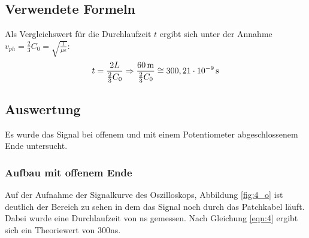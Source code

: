 \documentclass[12pt,a4paper]{article}
\begin{document}
\subsection{Verwendete Formeln}
Als Vergleichswert für die Durchlaufzeit $t$ ergibt sich unter der Annahme $v_{ph} = \frac{2}{3}C_0 = \sqrt{\frac{1}{\mu\epsilon}}$:
\begin{align}
t=\frac{2 L}{\frac{2}{3}C_0} \Rightarrow \frac{\unit[60]{m}}{\frac{2}{3}C_0} \cong \unit[300,21\cdot10^{-9}]{s}
\label{eqn:4}
\end{align}

\subsection{Auswertung}

Es wurde das Signal bei offenem und mit einem Potentiometer abgeschlossenem Ende untersucht.

\subsubsection{Aufbau mit offenem Ende}

Auf der Aufnahme der Signalkurve des Oszilloskops, Abbildung \ref{fig:4_o} ist deutlich der Bereich zu sehen in dem das Signal noch durch das Patchkabel läuft. Dabei wurde eine Durchlaufzeit von \unit[296]{ns} gemessen. Nach Gleichung \ref{eqn:4} ergibt sich ein Theoriewert von 300ns.
\end{document}
